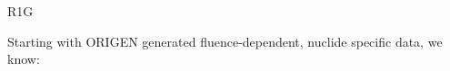 \documentclass[pdf, autumn, slideColor, nocolorBG]{prosper}
\begin{document}
\begin{slide}{R1G}
\begin{center}
Starting with ORIGEN generated fluence-dependent, nuclide specific data, we know:

\setcounter{figure}{3}
\begin{figure}

\end{figure}
\end{center}
\end{slide}
\end{document}

